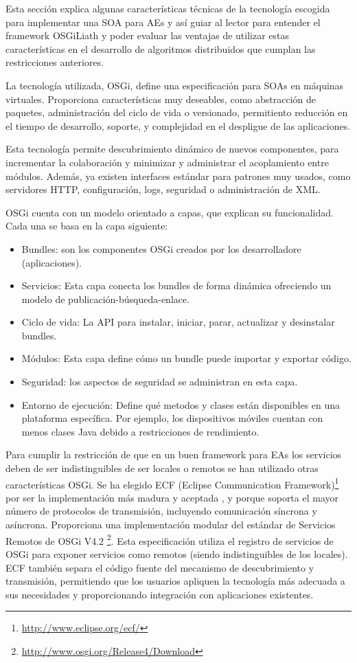 \documentclass[runningheads]{llncs}
\begin{document}
Esta sección explica algunas características técnicas de la tecnología escogida para implementar una SOA para AEs y así guiar al lector para entender el framework OSGiLiath y poder evaluar las ventajas de utilizar estas características en el desarrollo de algoritmos distribuidos que cumplan las restricciones anteriores.

La tecnología utilizada, OSGi, define una especificación para SOAs en máquinas virtuales. Proporciona características muy deseables, como abstracción de paquetes, administración del ciclo de vida o versionado, permitiento reducción en el tiempo de desarrollo, soporte, y complejidad en el despligue de las aplicaciones.

Esta tecnología permite descubrimiento dinámico de nuevos componentes, para incrementar la colaboración y minimizar y administrar el acoplamiento entre módulos. Además, ya existen interfaces estándar para patrones muy usados, como servidores HTTP, configuración, logs, seguridad o administración de XML.

OSGi cuenta con un modelo orientado a capas, que explican su funcionalidad. Cada una se basa en la capa siguiente:

\begin{itemize}
\item Bundles: son los componentes OSGi creados por los desarrolladore (aplicaciones).
\item Servicios: Esta capa conecta los bundles de forma dinámica ofreciendo un modelo de publicación-búsqueda-enlace.
\item Ciclo de vida: La API para instalar, iniciar, parar, actualizar y desinstalar bundles.
\item Módulos: Esta capa define cómo un bundle puede importar y exportar código.
\item Seguridad: los aspectos de seguridad se administran en esta capa.
\item Entorno de ejecución: Define qué metodos y clases están disponibles en una plataforma específica. Por ejemplo, los dispositivos móviles cuentan con menos clases Java debido a restricciones de rendimiento.
\end{itemize}

Para cumplir la restricción de que en un buen framework para EAs los servicios deben de ser indistinguibles de ser locales o remotos se han utilizado otras características OSGi.  Se ha elegido ECF (Eclipse Communication Framework)\footnote{\url{http://www.eclipse.org/ecf/}} por ser la implementación más madura y aceptada \cite{petzold2011dynamic}, y porque soporta el mayor número de protocolos de transmisión, incluyendo comunicación síncrona y asíncrona. Proporciona una implementación modular del estándar de Servicios Remotos de OSGi V4.2 \footnote{\url{http://www.osgi.org/Release4/Download}}. Esta especificación utiliza el registro de servicios de OSGi para exponer servicios como remotos (siendo indistinguibles de los locales). ECF también separa el código fuente del mecanismo de descubrimiento y transmisión, permitiendo que los usuarios apliquen la tecnología más adecuada a sus necesidades y proporcionando integración con aplicaciones existentes.
\end{document}
